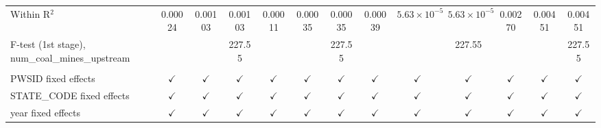 \begin{table}[htbp]
\begin{adjustbox}{width = \textwidth, center}
\begin{tabular}{lcccccccccccc}
         Within R$^2$                                      & 0.00024       & 0.00103        & 0.00103       & 0.00011       & 0.00035       & 0.00035       & 0.00039       & $5.63\times 10^{-5}$  & $5.63\times 10^{-5}$  & 0.00270        & 0.00451         & 0.00451\\  
         F-test (1st stage), num\_coal\_mines\_upstream    &               &                & 227.55        &               &               & 227.55        &               &                       & 227.55                &                &                 & 227.55\\  
          \\
         PWSID fixed effects                               & $\checkmark$  & $\checkmark$   & $\checkmark$  & $\checkmark$  & $\checkmark$  & $\checkmark$  & $\checkmark$  & $\checkmark$          & $\checkmark$          & $\checkmark$   & $\checkmark$    & $\checkmark$\\   
         STATE\_CODE fixed effects                         & $\checkmark$  & $\checkmark$   & $\checkmark$  & $\checkmark$  & $\checkmark$  & $\checkmark$  & $\checkmark$  & $\checkmark$          & $\checkmark$          & $\checkmark$   & $\checkmark$    & $\checkmark$\\   
         year fixed effects                                & $\checkmark$  & $\checkmark$   & $\checkmark$  & $\checkmark$  & $\checkmark$  & $\checkmark$  & $\checkmark$  & $\checkmark$          & $\checkmark$          & $\checkmark$   & $\checkmark$    & $\checkmark$\\   
         \bottomrule
      \end{tabular}
   \end{adjustbox}
\end{table}


